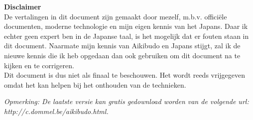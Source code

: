 \begin{center}
\textbf{Disclaimer}\\
De vertalingen in dit document zijn gemaakt door mezelf, m.b.v. offici\"{e}le documenten, moderne technologie en mijn eigen kennis van het Japans. Daar ik echter geen expert ben in de Japanse taal, is het mogelijk dat er fouten staan in dit document. Naarmate mijn kennis van Aikibudo en Japans stijgt, zal ik de nieuwe kennis die ik heb opgedaan dan ook gebruiken om dit document na te kijken en te corrigeren.\\
Dit document is dus niet als finaal te beschouwen. Het wordt reeds vrijgegeven omdat het kan helpen bij het onthouden van de technieken.
\end{center}
\begin{center}
\textit{{\em Opmerking:} De laatste versie kan gratis gedownload worden van de
volgende url: http://c.dommel.be/aikibudo.html.}
\end{center}
